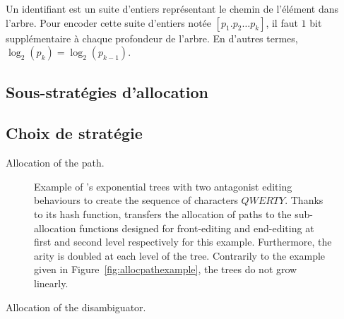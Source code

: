 Un identifiant \LSEQ est un suite d'entiers représentant le chemin de l'élément
dans l'arbre. Pour encoder cette suite d'entiers notée $[p_1.p_2\ldots p_k]$, il
faut $1$ bit supplémentaire à chaque profondeur de l'arbre. En d'autres termes,
$\log_2(p_k) = \log_2(p_{k-1})$.

\subsection{Sous-stratégies d'allocation}


\subsection{Choix de stratégie}


\begin{algorithm}
  
  \caption{\label{algo:allocpath}Allocation of the path.}
\end{algorithm}

\begin{figure}
  \centering
  
  \caption{\label{fig:lseqtreeexample} Example of \LSEQ's exponential trees
    with two antagonist editing behaviours to create the sequence of characters
    $QWERTY$. Thanks to its hash function, \LSEQ transfers the allocation of
    paths to the sub-allocation functions designed for front-editing and
    end-editing at first and second level respectively for this
    example. Furthermore, the arity is doubled at each level of the
    tree. Contrarily to the example given in Figure~\ref{fig:allocpathexample},
    the trees do not grow linearly.}
\end{figure}

\begin{algorithm}
  
  \caption{\label{algo:allocdes}Allocation of the disambiguator.}
\end{algorithm}


